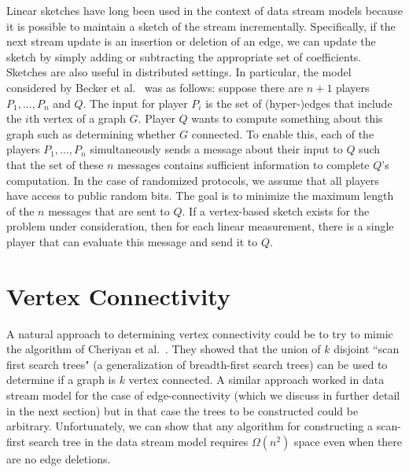 Linear sketches have long been used in the context of data stream models because it is possible to maintain a sketch of the stream incrementally. Specifically, if the next stream update is an insertion or deletion of an edge, we can update the sketch by simply adding or subtracting the appropriate set of coefficients.
Sketches are also useful in distributed settings. In particular, the model considered by Becker et al.~\cite{BeckerMNRST11} was as follows: suppose there are $n+1$ players $P_1, \ldots, P_n$ and $Q$. The input for player $P_i$ is the set of (hyper-)edges that include the $i$th vertex of a graph $G$. Player $Q$ wants to compute something about this graph such as determining whether $G$ connected. To enable this, each of the players $P_1, \ldots, P_n$  simultaneously sends a message about their input to $Q$ such that the set of these $n$ messages contains sufficient information to complete $Q$'s computation. In the case of randomized protocols, we assume that all players have access to public random bits. The goal is to minimize the maximum length of the $n$ messages that are sent to $Q$. If a vertex-based sketch exists for the problem under consideration, then for each linear measurement, there is a single player that can evaluate this message and send it to $Q$.

%

\section{Vertex Connectivity}\label{sec:vertex}

A natural approach to determining vertex connectivity could be to try to mimic the algorithm of Cheriyan et al.~\cite{CheriyanKT93}. They showed that the union of $k$ disjoint ``scan first search trees" (a generalization of breadth-first search trees) can be used to determine if a graph is $k$ vertex connected. A similar approach worked in data stream model for the case of edge-connectivity (which we discuss in further detail in the next section) but in that case the trees to be constructed could be arbitrary. Unfortunately, we can show %
that any algorithm for constructing a scan-first search tree in the data stream model requires $\Omega(n^2)$ space even when there are no edge deletions.\\

%


